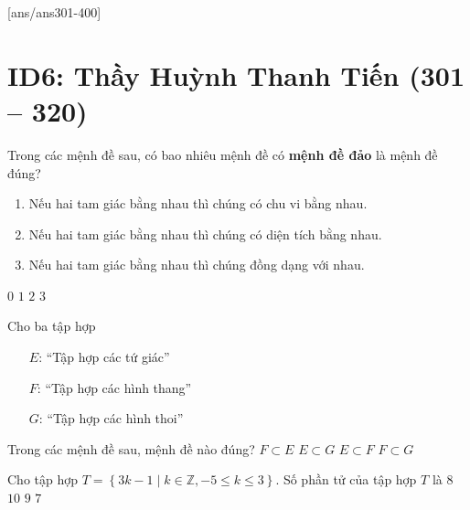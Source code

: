 [ans/ans301-400]
\setcounter{ex}{300}
\section*{ID6: Thầy Huỳnh Thanh Tiến (301 -- 320)}
\begin{ex}%
	Trong các mệnh đề sau, có bao nhiêu mệnh đề có \textbf{mệnh đề đảo} là mệnh đề đúng?
	\begin{enumerate}[(1)]
		\item Nếu hai tam giác bằng nhau thì chúng có chu vi bằng nhau.
		\item Nếu hai tam giác bằng nhau thì chúng có diện tích bằng nhau.
		\item Nếu hai tam giác bằng nhau thì chúng đồng dạng với nhau.
	\end{enumerate}
	\choice
	{\True $0$}
	{$1$}
	{$2$}
	{$3$}
\end{ex}
\begin{ex}%
	Cho ba tập hợp
	\begin{enumerate}
		\item [$E$:] ``Tập hợp các tứ giác''
		\item [$F$:] ``Tập hợp các hình thang''
		\item [$G$:] ``Tập hợp các hình thoi''
	\end{enumerate}
	Trong các mệnh đề sau, mệnh đề nào đúng?
	\choice
	{\True $F\subset E$}
	{$E\subset G$}
	{$E\subset F$}
	{$F\subset G$}
\end{ex}
\begin{ex}%
	Cho tập hợp $T=\left\{3k-1\;\big|\;k\in\mathbb{Z},-5\leq k\leq 3\right\}$. Số phần tử của tập hợp $T$ là
	\choice
	{$8$}
	{$10$}
	{\True $9$}
	{$7$}
\end{ex}
